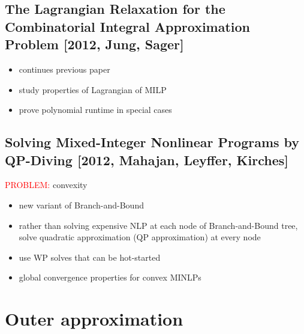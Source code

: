 \documentclass{article}
\begin{document}
\subsection{The Lagrangian Relaxation for the Combinatorial Integral Approximation Problem [2012, Jung, Sager]}
\begin{itemize}
\item continues previous paper
\item study properties of Lagrangian of MILP
\item prove polynomial runtime in special cases
\end{itemize}
\subsection{Solving Mixed-Integer Nonlinear Programs by QP-Diving [2012, Mahajan, Leyffer, Kirches]}
\textcolor{red}{PROBLEM:} convexity
\begin{itemize}
\item new variant of Branch-and-Bound
\item rather than solving expensive NLP at each node of Branch-and-Bound tree, solve quadratic approximation (QP approximation) at every node
\item use WP solves that can be hot-started
\item global convergence properties for convex MINLPs
\end{itemize}
\newpage
\section{Outer approximation}
\end{document}
